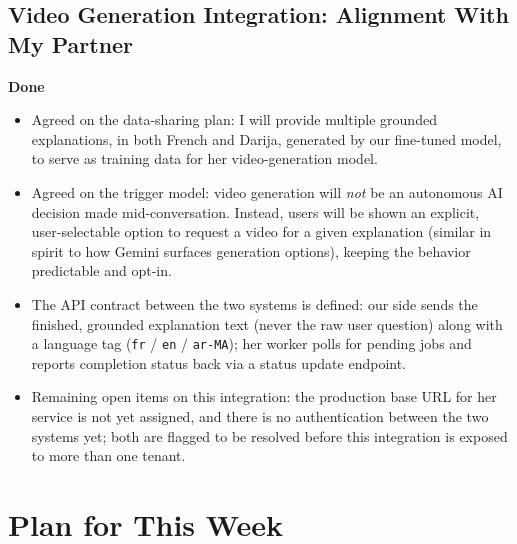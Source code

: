 \documentclass[11pt]{article}
\newcommand{\statusdone}{\textcolor{accent}{\textbf{Done}}}
\begin{document}
\subsection{Video Generation Integration: Alignment With My Partner}
\statusdone
\begin{itemize}
    \item Agreed on the data-sharing plan: I will provide multiple grounded explanations, in both French and Darija, generated by our fine-tuned model, to serve as training data for her video-generation model.
    \item Agreed on the trigger model: video generation will \emph{not} be an autonomous AI decision made mid-conversation. Instead, users will be shown an explicit, user-selectable option to request a video for a given explanation (similar in spirit to how Gemini surfaces generation options), keeping the behavior predictable and opt-in.
    \item The API contract between the two systems is defined: our side sends the finished, grounded explanation text (never the raw user question) along with a language tag (\texttt{fr} / \texttt{en} / \texttt{ar-MA}); her worker polls for pending jobs and reports completion status back via a status update endpoint.
    \item Remaining open items on this integration: the production base URL for her service is not yet assigned, and there is no authentication between the two systems yet; both are flagged to be resolved before this integration is exposed to more than one tenant.
\end{itemize}

\section{Plan for This Week}
\end{document}
